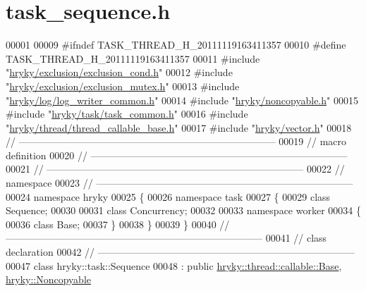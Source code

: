 \hypertarget{task__sequence_8h_source}{\section{task\-\_\-sequence.\-h}
}

\begin{DoxyCode}
00001 
00009 \textcolor{preprocessor}{#ifndef TASK\_THREAD\_H\_20111119163411357}
00010 \textcolor{preprocessor}{}\textcolor{preprocessor}{#define TASK\_THREAD\_H\_20111119163411357}
00011 \textcolor{preprocessor}{}\textcolor{preprocessor}{#include "\hyperlink{exclusion__cond_8h}{hryky/exclusion/exclusion_cond.h}"}
00012 \textcolor{preprocessor}{#include "\hyperlink{exclusion__mutex_8h}{hryky/exclusion/exclusion_mutex.h}"}
00013 \textcolor{preprocessor}{#include "\hyperlink{log__writer__common_8h}{hryky/log/log_writer_common.h}"}
00014 \textcolor{preprocessor}{#include "\hyperlink{noncopyable_8h}{hryky/noncopyable.h}"}
00015 \textcolor{preprocessor}{#include "\hyperlink{task__common_8h}{hryky/task/task_common.h}"}
00016 \textcolor{preprocessor}{#include "\hyperlink{thread__callable__base_8h}{hryky/thread/thread_callable_base.h}"}
00017 \textcolor{preprocessor}{#include "\hyperlink{vector_8h}{hryky/vector.h}"}
00018 \textcolor{comment}{//
      ------------------------------------------------------------------------------}
00019 \textcolor{comment}{// macro definition}
00020 \textcolor{comment}{//
      ------------------------------------------------------------------------------}
00021 \textcolor{comment}{//
      ------------------------------------------------------------------------------}
00022 \textcolor{comment}{// namespace}
00023 \textcolor{comment}{//
      ------------------------------------------------------------------------------}
00024 \textcolor{keyword}{namespace }hryky
00025 \{
00026 \textcolor{keyword}{namespace }task
00027 \{
00029     \textcolor{keyword}{class }Sequence;
00030 
00031     \textcolor{keyword}{class }Concurrency;
00032 
00033 \textcolor{keyword}{namespace }worker
00034 \{
00036     \textcolor{keyword}{class }Base;
00037 \}
00038 \}
00039 \}
00040 \textcolor{comment}{//
      ------------------------------------------------------------------------------}
00041 \textcolor{comment}{// class declaration}
00042 \textcolor{comment}{//
      ------------------------------------------------------------------------------}
00047 \textcolor{comment}{}\textcolor{keyword}{class }hryky::task::Sequence
00048     : \textcolor{keyword}{public} \hyperlink{classhryky_1_1thread_1_1callable_1_1_base}{hryky::thread::callable::Base}, \hyperlink{classhryky_1_1_noncopyable}{hryky::Noncopyable}

\end{DoxyCode}
